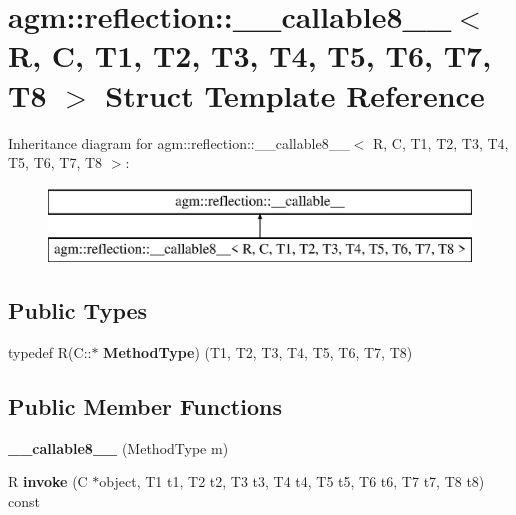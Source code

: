 \hypertarget{structagm_1_1reflection_1_1____callable8____}{}\section{agm\+:\+:reflection\+:\+:\+\_\+\+\_\+callable8\+\_\+\+\_\+$<$ R, C, T1, T2, T3, T4, T5, T6, T7, T8 $>$ Struct Template Reference}
\label{structagm_1_1reflection_1_1____callable8____}
Inheritance diagram for agm\+:\+:reflection\+:\+:\+\_\+\+\_\+callable8\+\_\+\+\_\+$<$ R, C, T1, T2, T3, T4, T5, T6, T7, T8 $>$\+:\begin{figure}[H]
\begin{center}
\leavevmode
\includegraphics[height=2.000000cm]{structagm_1_1reflection_1_1____callable8____}
\end{center}
\end{figure}
\subsection*{Public Types}
\begin{DoxyCompactItemize}
\item 
typedef R(C\+::$\ast$ {\bfseries Method\+Type}) (T1, T2, T3, T4, T5, T6, T7, T8)\hypertarget{structagm_1_1reflection_1_1____callable8_____a729c10f26357766a38a8cdcfeb7f2226}{}\label{structagm_1_1reflection_1_1____callable8_____a729c10f26357766a38a8cdcfeb7f2226}

\end{DoxyCompactItemize}
\subsection*{Public Member Functions}
\begin{DoxyCompactItemize}
\item 
{\bfseries \+\_\+\+\_\+callable8\+\_\+\+\_\+} (Method\+Type m)\hypertarget{structagm_1_1reflection_1_1____callable8_____ae31dfbfcd9131b68a0236c19958408a6}{}\label{structagm_1_1reflection_1_1____callable8_____ae31dfbfcd9131b68a0236c19958408a6}

\item 
R {\bfseries invoke} (C $\ast$object, T1 t1, T2 t2, T3 t3, T4 t4, T5 t5, T6 t6, T7 t7, T8 t8) const \hypertarget{structagm_1_1reflection_1_1____callable8_____ac0d5ccc14e270fb08c494725bbe04fb9}{}\label{structagm_1_1reflection_1_1____callable8_____ac0d5ccc14e270fb08c494725bbe04fb9}

\end{DoxyCompactItemize}
